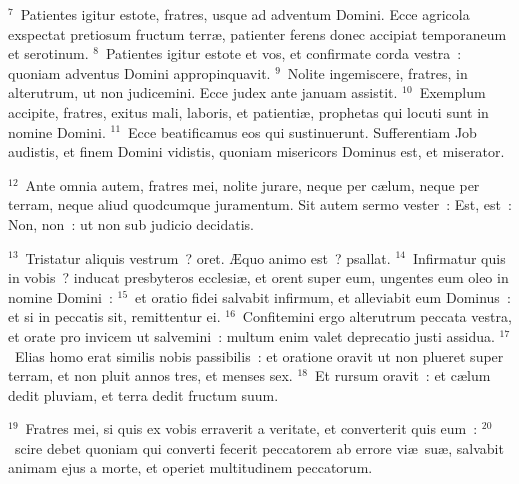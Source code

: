 ${}^{7}$~Patientes igitur estote, fratres, usque ad adventum Domini. Ecce agricola exspectat pretiosum fructum terr\ae , patienter ferens donec accipiat temporaneum et serotinum.
${}^{8}$~Patientes igitur estote et vos, et confirmate corda vestra~: quoniam adventus Domini appropinquavit.
${}^{9}$~Nolite ingemiscere, fratres, in alterutrum, ut non judicemini. Ecce judex ante januam assistit.
${}^{10}$~Exemplum accipite, fratres, exitus mali, laboris, et patienti\ae , prophetas qui locuti sunt in nomine Domini.
${}^{11}$~Ecce beatificamus eos qui sustinuerunt. Sufferentiam Job audistis, et finem Domini vidistis, quoniam misericors Dominus est, et miserator.


${}^{12}$~Ante omnia autem, fratres mei, nolite jurare, neque per c\ae lum, neque per terram, neque aliud quodcumque juramentum. Sit autem sermo vester~: Est, est~: Non, non~: ut non sub judicio decidatis.


${}^{13}$~Tristatur aliquis vestrum~? oret. \AE quo animo est~? psallat.
${}^{14}$~Infirmatur quis in vobis~? inducat presbyteros ecclesi\ae , et orent super eum, ungentes eum oleo in nomine Domini~:
${}^{15}$~et oratio fidei salvabit infirmum, et alleviabit eum Dominus~: et si in peccatis sit, remittentur ei.
${}^{16}$~Confitemini ergo alterutrum peccata vestra, et orate pro invicem ut salvemini~: multum enim valet deprecatio justi assidua.
${}^{17}$~Elias homo erat similis nobis passibilis~: et oratione oravit ut non plueret super terram, et non pluit annos tres, et menses sex.
${}^{18}$~Et rursum oravit~: et c\ae lum dedit pluviam, et terra dedit fructum suum.


${}^{19}$~Fratres mei, si quis ex vobis erraverit a veritate, et converterit quis eum~:
${}^{20}$~scire debet quoniam qui converti fecerit peccatorem ab errore vi\ae\ su\ae , salvabit animam ejus a morte, et operiet multitudinem peccatorum.
